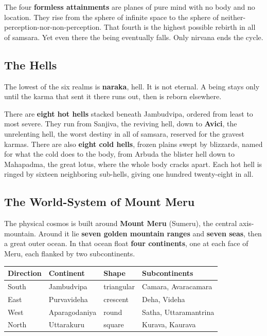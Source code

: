 The four \textbf{formless attainments} are planes of pure mind with no body and no location. They rise from the sphere of infinite space to the sphere of neither-perception-nor-non-perception. That fourth is the highest possible rebirth in all of samsara. Yet even there the being eventually falls. Only nirvana ends the cycle.

\subsection{The Hells}

The lowest of the six realms is \textbf{naraka}, hell. It is not eternal. A being stays only until the karma that sent it there runs out, then is reborn elsewhere.

There are \textbf{eight hot hells} stacked beneath Jambudvipa, ordered from least to most severe. They run from Sanjiva, the reviving hell, down to \textbf{Avici}, the unrelenting hell, the worst destiny in all of samsara, reserved for the gravest karmas. There are also \textbf{eight cold hells}, frozen plains swept by blizzards, named for what the cold does to the body, from Arbuda the blister hell down to Mahapadma, the great lotus, where the whole body cracks apart. Each hot hell is ringed by sixteen neighboring sub-hells, giving one hundred twenty-eight in all.

\subsection{The World-System of Mount Meru}

The physical cosmos is built around \textbf{Mount Meru} (Sumeru), the central axis-mountain. Around it lie \textbf{seven golden mountain ranges} and \textbf{seven seas}, then a great outer ocean. In that ocean float \textbf{four continents}, one at each face of Meru, each flanked by two subcontinents.

\begin{longtable}{@{}
L{1.8cm}L{2.8cm}L{2.2cm}L{4.0cm}@{}}
\toprule
Direction & Continent & Shape & Subcontinents \\
\midrule
South & Jambudvipa & triangular & Camara, Avaracamara \\
East & Purvavideha & crescent & Deha, Videha \\
West & Aparagodaniya & round & Satha, Uttaramantrina \\
North & Uttarakuru & square & Kurava, Kaurava \\
\bottomrule
\end{longtable}

